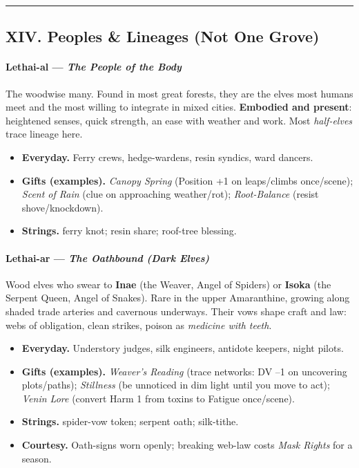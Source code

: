 \documentclass[11pt]{article}
\begin{document}
\medskip\hrule\medskip

\subsection{XIV. Peoples \& Lineages (Not One Grove)}

\paragraph{Lethai-al --- \emph{The People of the Body}} 
The woodwise many. Found in most great forests, they are the elves most humans meet and the most willing to integrate in mixed cities. \textbf{Embodied and present}: heightened senses, quick strength, an ease with weather and work. Most \emph{half-elves} trace lineage here.

\begin{itemize}[leftmargin=*]
  \item \textbf{Everyday.} Ferry crews, hedge-wardens, resin syndics, ward dancers.
  \item \textbf{Gifts (examples).} \emph{Canopy Spring} (Position +1 on leaps/climbs once/scene); \emph{Scent of Rain} (clue on approaching weather/rot); \emph{Root-Balance} (resist shove/knockdown).
  \item \textbf{Strings.} ferry knot; resin share; roof-tree blessing.
\end{itemize}

\paragraph{Lethai-ar --- \emph{The Oathbound (Dark Elves)}} 
Wood elves who swear to \textbf{Inae} (the Weaver, Angel of Spiders) or \textbf{Isoka} (the Serpent Queen, Angel of Snakes). Rare in the upper Amaranthine, growing along shaded trade arteries and cavernous underways. Their vows shape craft and law: webs of obligation, clean strikes, poison as \emph{medicine with teeth}.

\begin{itemize}[leftmargin=*]
  \item \textbf{Everyday.} Understory judges, silk engineers, antidote keepers, night pilots.
  \item \textbf{Gifts (examples).} \emph{Weaver's Reading} (trace networks: DV --1 on uncovering plots/paths); \emph{Stillness} (be unnoticed in dim light until you move to act); \emph{Venin Lore} (convert Harm 1 from toxins to Fatigue once/scene).
  \item \textbf{Strings.} spider-vow token; serpent oath; silk-tithe.
  \item \textbf{Courtesy.} Oath-signs worn openly; breaking web-law costs \emph{Mask Rights} for a season.
\end{itemize}
\end{document}
